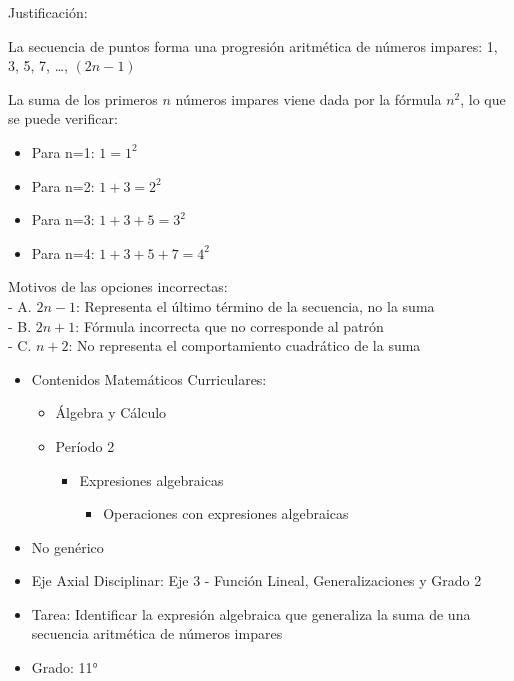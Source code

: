 \documentclass[
]{article}
\providecommand{\tightlist}{%
  \setlength{\itemsep}{0pt}\setlength{\parskip}{0pt}}
\begin{document}
Justificación:

La secuencia de puntos forma una progresión aritmética de números
impares: 1, 3, 5, 7, \ldots, \((2n-1)\)

La suma de los primeros \(n\) números impares viene dada por la fórmula
\(n^2\), lo que se puede verificar:

\begin{itemize}
\tightlist
\item
  Para n=1: \(1 = 1^2\)
\item
  Para n=2: \(1 + 3 = 2^2\)
\item
  Para n=3: \(1 + 3 + 5 = 3^2\)
\item
  Para n=4: \(1 + 3 + 5 + 7 = 4^2\)
\end{itemize}

Motivos de las opciones incorrectas:\\
- A. \(2n-1\): Representa el último término de la secuencia, no la
suma\\
- B. \(2n+1\): Fórmula incorrecta que no corresponde al patrón\\
- C. \(n+2\): No representa el comportamiento cuadrático de la suma

\begin{itemize}
\tightlist
\item
  Contenidos Matemáticos Curriculares:

  \begin{itemize}
  \tightlist
  \item
    Álgebra y Cálculo
  \item
    Período 2

    \begin{itemize}
    \tightlist
    \item
      Expresiones algebraicas

      \begin{itemize}
      \tightlist
      \item
        Operaciones con expresiones algebraicas
      \end{itemize}
    \end{itemize}
  \end{itemize}
\item
  No genérico
\item
  Eje Axial Disciplinar: Eje 3 - Función Lineal, Generalizaciones y
  Grado 2
\item
  Tarea: Identificar la expresión algebraica que generaliza la suma de
  una secuencia aritmética de números impares
\item
  Grado: 11°
\end{itemize}
\end{document}
